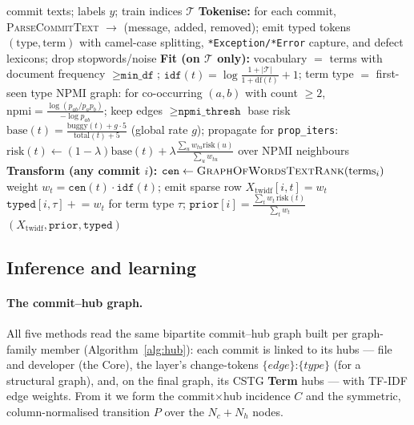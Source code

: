 \documentclass[11pt,a4paper]{article}
\newcommand{\code}[1]{\texttt{#1}}
\newcommand{\node}[1]{\textcolor{kgblue}{\textbf{#1}}}
\begin{document}
	\begin{algorithm}[H]
	\caption{CSTG fit (train-only) and per-commit transform}\label{alg:cstg}
	\begin{algorithmic}[1]
	\Require commit texts; labels $y$; train indices $\mathcal{T}$
	\Statex \textbf{Tokenise:} for each commit, \textsc{ParseCommitText} $\to$ (message, added, removed); emit typed tokens $(\text{type},\text{term})$ with camel-case splitting, \code{*Exception/*Error} capture, and defect lexicons; drop stopwords/noise
	\Statex \textbf{Fit (on $\mathcal{T}$ only):}
	\State vocabulary $=$ terms with document frequency $\ge \code{min\_df}$; $\code{idf}(t)=\log\frac{1+|\mathcal{T}|}{1+\mathrm{df}(t)}+1$; term type $=$ first-seen type
	\State NPMI graph: for co-occurring $(a,b)$ with count $\ge2$, $\mathrm{npmi}=\frac{\log(p_{ab}/p_a p_b)}{-\log p_{ab}}$; keep edges $\ge\code{npmi\_thresh}$
	\State base risk $\mathrm{base}(t)=\frac{\text{buggy}(t)+g\cdot5}{\text{total}(t)+5}$ (global rate $g$); propagate for \code{prop\_iters}: $\mathrm{risk}(t)\!\gets\!(1{-}\lambda)\mathrm{base}(t)+\lambda\frac{\sum_{u}w_{tu}\mathrm{risk}(u)}{\sum_u w_{tu}}$ over NPMI neighbours
	\Statex \textbf{Transform (any commit $i$):}
	\State $\code{cen}\gets\textsc{GraphOfWordsTextRank}(\text{terms}_i)$ 
	\State weight $w_t=\code{cen}(t)\cdot\code{idf}(t)$; emit sparse row $X_{\text{twidf}}[i,t]=w_t$
	\State $\code{typed}[i,\tau]\mathrel{+}=w_t$ for term type $\tau$; \; $\code{prior}[i]=\frac{\sum_t w_t\,\mathrm{risk}(t)}{\sum_t w_t}$
	\State \Return $(X_{\text{twidf}},\code{prior},\code{typed})$
	\end{algorithmic}
	\end{algorithm}

	\subsection{Inference and learning}\label{sec:algo-infer}

	\paragraph{The commit--hub graph.} All five methods read the same
	bipartite commit--hub graph built per graph-family member
	(Algorithm~\ref{alg:hub}): each commit is linked to its hubs --- file and developer
	(the Core), the layer's change-tokens $\{edge\}\code{:}\{type\}$ (for a structural
	graph), and, on the final graph, its CSTG \node{Term} hubs --- with TF-IDF edge
	weights. From it we form the commit$\times$hub incidence $C$ and the symmetric,
	column-normalised transition $P$ over the $N_c{+}N_h$ nodes.
\end{document}
